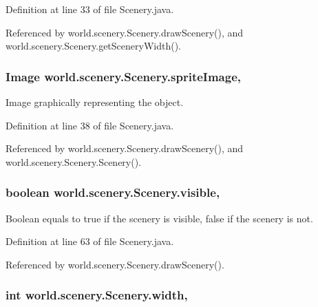 Definition at line 33 of file Scenery.\-java.



Referenced by world.\-scenery.\-Scenery.\-draw\-Scenery(), and world.\-scenery.\-Scenery.\-get\-Scenery\-Width().

\hypertarget{a00024_a512d9c0a154e6843389e343d80843326}{
\subsubsection[{sprite\-Image}]{\setlength{\rightskip}{0pt plus 5cm}Image world.\-scenery.\-Scenery.\-sprite\-Image\hspace{0.3cm}{\ttfamily [protected]}, {\ttfamily [inherited]}}}\label{a00024_a512d9c0a154e6843389e343d80843326}


Image graphically representing the object. 



Definition at line 38 of file Scenery.\-java.



Referenced by world.\-scenery.\-Scenery.\-draw\-Scenery(), and world.\-scenery.\-Scenery.\-Scenery().

\hypertarget{a00024_a7b22a78d3126c947b7010fdbbea02218}{
\subsubsection[{visible}]{\setlength{\rightskip}{0pt plus 5cm}boolean world.\-scenery.\-Scenery.\-visible\hspace{0.3cm}{\ttfamily [protected]}, {\ttfamily [inherited]}}}\label{a00024_a7b22a78d3126c947b7010fdbbea02218}


Boolean equals to true if the scenery is visible, false if the scenery is not. 



Definition at line 63 of file Scenery.\-java.



Referenced by world.\-scenery.\-Scenery.\-draw\-Scenery().

\hypertarget{a00024_ad10b27080954e2fc06aa1718f47c4ce1}{
\subsubsection[{width}]{\setlength{\rightskip}{0pt plus 5cm}int world.\-scenery.\-Scenery.\-width\hspace{0.3cm}{\ttfamily [protected]}, {\ttfamily [inherited]}}}\label{a00024_ad10b27080954e2fc06aa1718f47c4ce1}


